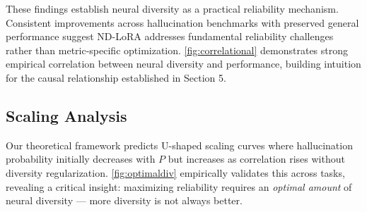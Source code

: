 \documentclass{article} %
\begin{document}
These findings establish neural diversity as a practical reliability mechanism. Consistent improvements
across hallucination benchmarks with preserved general performance suggest ND-LoRA addresses fundamental
reliability challenges rather than metric-specific optimization. \autoref{fig:correlational} demonstrates
strong empirical correlation between neural diversity and performance, building intuition for the causal
relationship established in Section 5.

\subsection{Scaling Analysis}
Our theoretical framework predicts U-shaped scaling curves where hallucination probability initially
decreases with $P$ but increases as correlation rises without diversity regularization.
\autoref{fig:optimaldiv} empirically validates this across tasks, revealing a critical insight: maximizing
reliability requires an \emph{optimal amount} of neural diversity --- more diversity is not always better.
\end{document}
